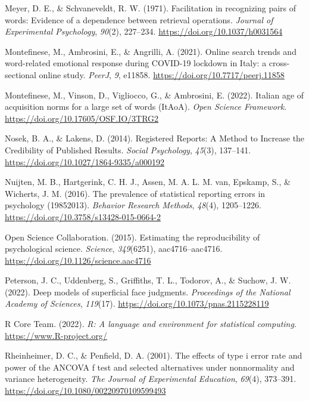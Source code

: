 \documentclass[
  man]{apa7}
\newlength{\cslhangindent}
\newlength{\cslentryspacingunit} %
\newenvironment{CSLReferences}[2] %
 {%
  \setlength{\parindent}{0pt}
  \ifodd #1
  \let\oldpar\par
  \def\par{\hangindent=\cslhangindent\oldpar}
  \fi
  \setlength{\parskip}{#2\cslentryspacingunit}
 }%
 {}
\begin{document}
\begin{CSLReferences}{1}{0}
\leavevmode{}%
Meyer, D. E., \& Schvaneveldt, R. W. (1971). Facilitation in recognizing pairs of words: Evidence of a dependence between retrieval operations. \emph{Journal of Experimental Psychology}, \emph{90}(2), 227--234. \url{https://doi.org/10.1037/h0031564}

\leavevmode{}%
Montefinese, M., Ambrosini, E., \& Angrilli, A. (2021). Online search trends and word-related emotional response during COVID-19 lockdown in Italy: a cross-sectional online study. \emph{PeerJ}, \emph{9}, e11858. \url{https://doi.org/10.7717/peerj.11858}

\leavevmode{}%
Montefinese, M., Vinson, D., Vigliocco, G., \& Ambrosini, E. (2022). Italian age of acquisition norms for a large set of words (ItAoA). \emph{Open Science Framework}. \url{https://doi.org/10.17605/OSF.IO/3TRG2}

\leavevmode{}%
Nosek, B. A., \& Lakens, D. (2014). Registered Reports: A Method to Increase the Credibility of Published Results. \emph{Social Psychology}, \emph{45}(3), 137--141. \url{https://doi.org/10.1027/1864-9335/a000192}

\leavevmode{}%
Nuijten, M. B., Hartgerink, C. H. J., Assen, M. A. L. M. van, Epskamp, S., \& Wicherts, J. M. (2016). The prevalence of statistical reporting errors in psychology (1985{\textendash}2013). \emph{Behavior Research Methods}, \emph{48}(4), 1205--1226. \url{https://doi.org/10.3758/s13428-015-0664-2}

\leavevmode{}%
Open Science Collaboration. (2015). Estimating the reproducibility of psychological science. \emph{Science}, \emph{349}(6251), aac4716--aac4716. \url{https://doi.org/10.1126/science.aac4716}

\leavevmode{}%
Peterson, J. C., Uddenberg, S., Griffiths, T. L., Todorov, A., \& Suchow, J. W. (2022). Deep models of superficial face judgments. \emph{Proceedings of the National Academy of Sciences}, \emph{119}(17). \url{https://doi.org/10.1073/pnas.2115228119}

\leavevmode{}%
R Core Team. (2022). \emph{R: A language and environment for statistical computing}. \url{https://www.R-project.org/}

\leavevmode{}%
Rheinheimer, D. C., \& Penfield, D. A. (2001). The effects of type i error rate and power of the ANCOVA f test and selected alternatives under nonnormality and variance heterogeneity. \emph{The Journal of Experimental Education}, \emph{69}(4), 373--391. \url{https://doi.org/10.1080/00220970109599493}


\end{CSLReferences}
\end{document}
